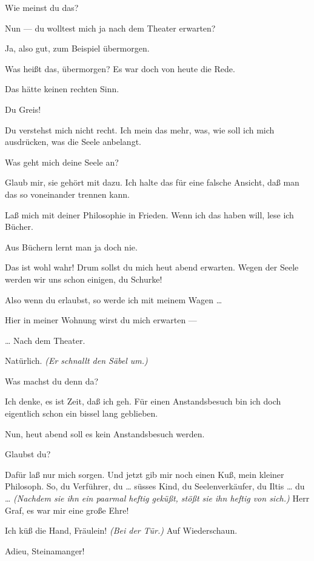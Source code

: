 \documentclass[
	final,
	a4paper,
	ngerman,
	mpinclude = true, %
	twoside = true,
	open = right,
	cleardoublepage = plain,
	DIV = 13,
	BCOR = 1cm,
	titlepage = firstiscover,
	]{scrbook}
\newcommand{\direction}[1]{\textit{(#1)}}
\newcommand{\thecharacter}[1]{\textup{\textsc{#1}}}
\newcommand{\theschauspielerin}{\thecharacter{Schauspielerin}}
\newcommand{\thegraf}{\thecharacter{Graf}}
\newcommand{\character}[1]{\item[#1:]}
\newcommand{\schauspielerin}{\character{\theschauspielerin}}
\newcommand{\graf}{\character{\thegraf}}
\begin{document}
\begin{play}
	\graf
	Wie meinst du das?

	\schauspielerin
	Nun --- du wolltest mich ja nach dem Theater erwarten?

	\graf
	Ja, also gut, zum Beispiel übermorgen.

	\schauspielerin
	Was heißt das, übermorgen? Es war doch von heute die Rede.

	\graf
	Das hätte keinen rechten Sinn.

	\schauspielerin
	Du Greis!

	\graf
	Du verstehst mich nicht recht. Ich mein das mehr, was, wie soll ich mich ausdrücken, was die Seele anbelangt.

	\schauspielerin
	Was geht mich deine Seele an?

	\graf
	Glaub mir, sie gehört mit dazu. Ich halte das für eine falsche Ansicht, daß man das so voneinander trennen kann.

	\schauspielerin
	Laß mich mit deiner Philosophie in Frieden. Wenn ich das haben will, lese ich Bücher.

	\graf
	Aus Büchern lernt man ja doch nie.

	\schauspielerin
	Das ist wohl wahr! Drum sollst du mich heut abend erwarten. Wegen der Seele werden wir uns schon einigen, du Schurke!

	\graf
	Also wenn du erlaubst, so werde ich mit meinem Wagen \ldots{}

	\schauspielerin
	Hier in meiner Wohnung wirst du mich erwarten ---

	\graf
	\ldots{} Nach dem Theater.

	\schauspielerin
	Natürlich. \direction{Er schnallt den Säbel um.}

	\schauspielerin
	Was machst du denn da?

	\graf
	Ich denke, es ist Zeit, daß ich geh. Für einen Anstandsbesuch bin ich doch eigentlich schon ein bissel lang geblieben.

	\schauspielerin
	Nun, heut abend soll es kein Anstandsbesuch werden.

	\graf
	Glaubst du?

	\schauspielerin
	Dafür laß nur mich sorgen. Und jetzt gib mir noch einen Kuß, mein kleiner Philosoph. So, du Verführer, du \ldots{} süsses Kind, du Seelenverkäufer, du Iltis \ldots{} du \ldots{} \direction{Nachdem sie ihn ein paarmal heftig geküßt, stößt sie ihn heftig von sich.} Herr Graf, es war mir eine große Ehre!

	\graf
	Ich küß die Hand, Fräulein! \direction{Bei der Tür.} Auf Wiederschaun.

	\schauspielerin
	Adieu, Steinamanger!

\end{play}
\end{document}
